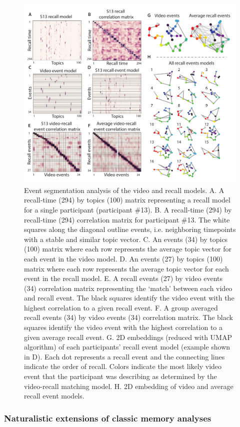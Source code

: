 \documentclass[a4paper,man,natbib,floatsintext]{apa6}
\begin{document}
\begin{figure}[t!]
\centering
\includegraphics[width=.75\textwidth]{figs/2_eventseg.pdf}
\caption{\label{fig:eventseg} Event segmentation analysis of the video and recall models. A. A recall-time (294) by topics (100) matrix representing a recall model for a single participant (participant \#13).  B. A recall-time (294) by recall-time (294) correlation matrix for participant \#13. The white squares along the diagonal outline events, i.e. neighboring timepoints with a stable and similar topic vector. C. An events (34) by topics (100) matrix where each row represents the average topic vector for each event in the video model.  D. An events (27) by topics (100) matrix where each row represents the average topic vector for each event in the recall model. E. A recall events (27) by video events (34) correlation matrix representing the `match' between each video and recall event. The black squares identify the video event with the highest correlation to a given recall event. F. A group averaged recall events (34) by video events (34) correlation matrix.  The black squares identify the video event with the highest correlation to a given average recall event. G. 2D embeddings (reduced with UMAP algorithm) of each participants' recall event model (example shown in D). Each dot represents a recall event and the connecting lines indicate the order of recall. Colors indicate the most likely video event that the participant was describing as determined by the video-recall matching model.  H. 2D embedding of video and average recall event models.  }
\end{figure}


\subsubsection{Naturalistic extensions of classic memory analyses}
\end{document}
